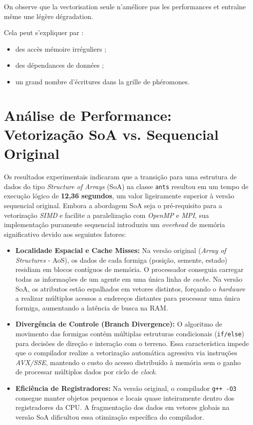 \documentclass[11pt]{article}
\begin{document}
On observe que la vectorisation seule n'améliore pas les performances et entraîne même une légère dégradation.

Cela peut s'expliquer par :

\begin{itemize}
\item des accès mémoire irréguliers ;
\item des dépendances de données ;
\item un grand nombre d'écritures dans la grille de phéromones.
\end{itemize}


\section{Análise de Performance: Vetorização SoA vs. Sequencial Original}

Os resultados experimentais indicaram que a transição para uma estrutura de dados do tipo \textit{Structure of Arrays} (SoA) na classe \texttt{ants} resultou em um tempo de execução lógico de \textbf{12,36 segundos}, um valor ligeiramente superior à versão sequencial original. Embora a abordagem SoA seja o pré-requisito para a vetorização \textit{SIMD} e facilite a paralelização com \textit{OpenMP} e \textit{MPI}, sua implementação puramente sequencial introduziu um \textit{overhead} de memória significativo devido aos seguintes fatores:

\begin{itemize}
    \item \textbf{Localidade Espacial e Cache Misses:} Na versão original (\textit{Array of Structures} - AoS), os dados de cada formiga (posição, semente, estado) residiam em blocos contíguos de memória. O processador conseguia carregar todas as informações de um agente em uma única linha de \textit{cache}. Na versão SoA, os atributos estão espalhados em vetores distintos, forçando o \textit{hardware} a realizar múltiplos acessos a endereços distantes para processar uma única formiga, aumentando a latência de busca na RAM.
    
    \item \textbf{Divergência de Controle (Branch Divergence):} O algoritmo de movimento das formigas contém múltiplas estruturas condicionais (\texttt{if/else}) para decisões de direção e interação com o terreno. Essa característica impede que o compilador realize a vetorização automática agressiva via instruções \textit{AVX/SSE}, mantendo o custo do acesso distribuído à memória sem o ganho de processar múltiplos dados por ciclo de \textit{clock}.
    
    \item \textbf{Eficiência de Registradores:} Na versão original, o compilador \texttt{g++ -O3} consegue manter objetos pequenos e locais quase inteiramente dentro dos registradores da CPU. A fragmentação dos dados em vetores globais na versão SoA dificultou essa otimização específica do compilador.
\end{itemize}
\end{document}
